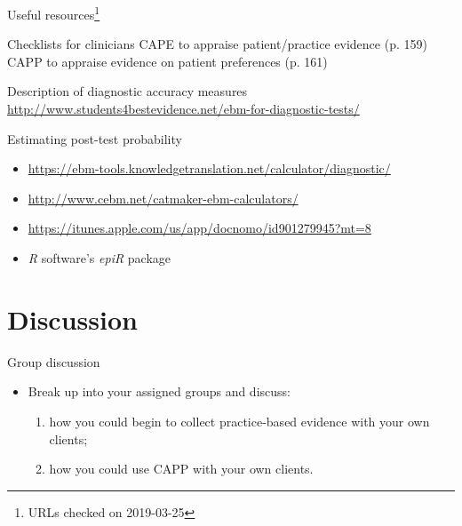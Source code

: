 \documentclass{beamer}
\begin{document}
% 
\begin{frame}{Useful resources\footnote{\tiny{URLs checked on 2019-03-25}}}
	\begin{block}{Checklists for clinicians \citep{Dollaghan2007a}}
	CAPE to appraise patient/practice evidence (p. 159)\\
	CAPP to appraise evidence on patient preferences (p. 161)
	\end{block}

	\begin{block}{Description of diagnostic accuracy measures}
	\footnotesize{\url{http://www.students4bestevidence.net/ebm-for-diagnostic-tests/}}
	\end{block}

	\begin{block}{Estimating post-test probability}
		\begin{itemize}
		\item \url{https://ebm-tools.knowledgetranslation.net/calculator/diagnostic/} 
		\item \url{http://www.cebm.net/catmaker-ebm-calculators/} 
		\item \url{https://itunes.apple.com/us/app/docnomo/id901279945?mt=8}
		\item \emph{R} software's \emph{epiR} package \citep{Stevenson2017} 
		\end{itemize}
	\end{block}
\end{frame}

\section{Discussion}

% 
\begin{frame}{Group discussion}
	\begin{itemize}
	\item Break up into your assigned groups and discuss:
		\begin{enumerate}
		\item how you could begin to collect practice-based evidence with your own clients;
		\item how you could use CAPP with your own clients.
		\end{enumerate}
	\end{itemize}
\end{frame}

\end{document}
